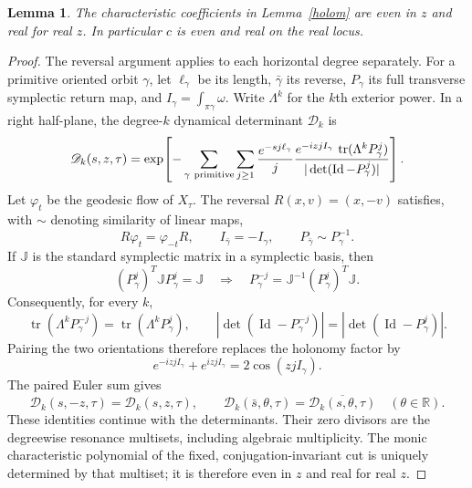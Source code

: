 \documentclass[11pt,letterpaper,reqno]{amsart}
\newtheorem{lemma}[theorem]{Lemma}
\theoremstyle{remark}
\newcommand{\Id}{\operatorname{Id}}
\newcommand{\tr}{\operatorname{tr}}
\begin{document}
\begin{lemma}\label{even}
The characteristic coefficients in Lemma~\ref{holom} are even in
$z$ and real for real $z$. In particular $c$ is even and real on the
real locus.
\end{lemma}
\begin{proof}
The reversal argument applies to each horizontal degree separately.
For a primitive oriented orbit $\gamma$, let $\ell_\gamma$ be its
length, $\bar\gamma$ its reverse, $P_\gamma$ its full transverse
symplectic return map, and $I_\gamma=\int_{\pi\gamma}\omega$.
Write $\Lambda^k$ for the $k$th exterior power. In a right
half-plane, the degree-$k$ dynamical determinant $\mathscr D_k$ is
\begin{equation}\label{xp:degreewise-euler}
 \mathscr D_k(s,z,\tau)=\exp\!\left[
  -\sum_{\gamma\ {\rm primitive}}\sum_{j\geq1}
    \frac{e^{-sj\ell_\gamma}}{j}
    \frac{e^{-izjI_\gamma}\,
          \tr(\Lambda^kP_\gamma^j)}
         {|\det(\Id-P_\gamma^j)|}\right].
\end{equation}
Let $\varphi_t$ be the geodesic flow of $X_\tau$. The reversal
\(R(x,v)=(x,-v)\) satisfies, with $\sim$ denoting similarity of
linear maps,
\[
 R\varphi_t=\varphi_{-t}R,
 \qquad
 I_{\bar\gamma}=-I_\gamma,
 \qquad
 P_{\bar\gamma}\sim P_\gamma^{-1}.
\]
If $\mathbb J$ is the standard symplectic matrix in a symplectic
basis, then
\[
 (P_\gamma^j)^T\mathbb J P_\gamma^j=\mathbb J
 \quad\Longrightarrow\quad
 P_\gamma^{-j}=\mathbb J^{-1}(P_\gamma^j)^T\mathbb J.
\]
Consequently, for every \(k\),
\begin{equation}\label{xp:inverse-exterior-traces}
 \tr(\Lambda^kP_\gamma^{-j})
   =\tr(\Lambda^kP_\gamma^j),
 \qquad
 |\det(\Id-P_\gamma^{-j})|
   =|\det(\Id-P_\gamma^j)|.
\end{equation}
Pairing the two orientations therefore replaces the holonomy factor
by
\[
 e^{-izjI_\gamma}+e^{izjI_\gamma}
       =2\cos(zjI_\gamma).
\]
The paired Euler sum gives
\begin{equation}\label{xp:degreewise-symmetry}
 \mathscr D_k(s,-z,\tau)=\mathscr D_k(s,z,\tau),
 \qquad
 \mathscr D_k(\bar s,\theta,\tau)
       =\overline{\mathscr D_k(s,\theta,\tau)}
       \quad(\theta\in\mathbb R).
\end{equation}
These identities continue with the determinants.  Their zero
divisors are the degreewise resonance multisets, including algebraic
multiplicity.  The monic characteristic polynomial of the fixed,
conjugation-invariant cut is uniquely determined by that multiset;
it is therefore even in \(z\) and real for real \(z\).
\end{proof}
\end{document}

